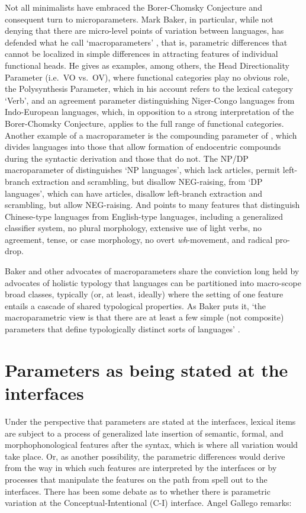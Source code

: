 \documentclass[output=paper,
modfonts
]{LSP/langsci}
\begin{document}
Not all minimalists have embraced the Borer-Chomsky Conjecture and
consequent turn to microparameters. Mark Baker, in particular, while not
denying that there are micro-level points of variation between
languages, has defended what he call `macroparameters' \citep{baker1996},
that is, parametric differences that cannot be localized in simple
differences in attracting features of individual functional heads. He
gives as examples, among others, the Head Directionality Parameter (i.e.\
VO vs.\ OV), where functional categories play no obvious role, the
Polysynthesis Parameter, which in his account refers to the lexical
category `Verb', and an agreement parameter \citep{baker2008} distinguishing
Niger-Congo languages from Indo-European languages, which, in opposition
to a strong interpretation of the Borer-Chomsky Conjecture, applies to
the full range of functional categories. Another example of a
macroparameter is the compounding parameter of \citet[328]{snyder2001}, which
divides languages into those that allow formation of endocentric
compounds during the syntactic derivation and those that do not. The
NP/DP macroparameter of \citet{boskovic2011} distinguishes `NP
languages', which lack articles, permit left-branch extraction and
scrambling, but disallow NEG-raising, from `DP languages', which can
have articles, disallow left-branch extraction and scrambling, but allow
NEG-raising. And \citet{huang2007} points to many features that distinguish
Chinese-type languages from English-type languages, including a
generalized classifier system, no plural morphology, extensive use of
light verbs, no agreement, tense, or case morphology, no overt
\emph{wh}-movement, and radical pro-drop.

Baker and other advocates of macroparameters share the conviction long
held by advocates of holistic typology that languages can be partitioned
into macro-scope broad classes, typically (or, at least, ideally) where
the setting of one feature entails a cascade of shared typological
properties. As Baker puts it, `the macroparametric view is that there
are at least a few simple (not composite) parameters that define
typologically distinct sorts of languages' \citep[355]{baker2008}.

\section{Parameters as being stated at the interfaces}

Under the perspective that parameters are stated at the interfaces,
lexical items are subject to a process of generalized late insertion of
semantic, formal, and morphophonological features after the syntax,
which is where all variation would take place. Or, as another
possibility, the parametric differences would derive from the way in
which such features are interpreted by the interfaces or by processes
that manipulate the features on the path from spell out to the
interfaces. There has been some debate as to whether there is parametric
variation at the Conceptual-Intentional (C-I) interface. Angel Gallego
remarks:
\end{document}
